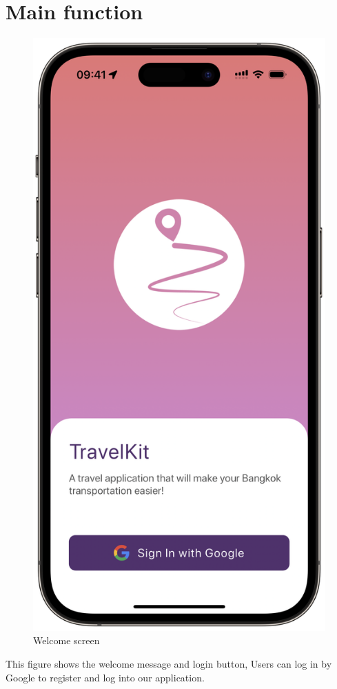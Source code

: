 \section{Main function}
\begin{figure}[!h]
	\centering
	\includegraphics[width=0.5\linewidth]{chapter4/welcome_screen.png}
	\caption{Welcome screen}
	\label{fig:Welcome screen}
\end{figure}
This figure shows the welcome message and login button, Users can log in by Google to register and log into our application.

